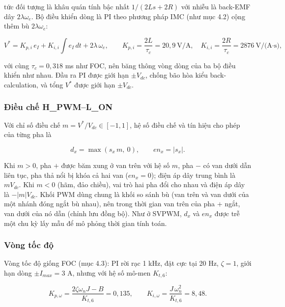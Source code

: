 tức đối tượng là khâu quán tính bậc nhất $1/(2Ls + 2R)$ với nhiễu là back-EMF dây $2\lambda\omega_e$. Bộ điều khiển dòng là PI theo phương pháp IMC (như mục 4.2) cộng thêm bù $2\lambda\omega_e$:

\begin{equation}
V^* = K_{p,i}\,e_I + K_{i,i}\!\int e_I\,dt + 2\lambda\,\omega_e, \qquad K_{p,i} = \frac{2L}{\tau_c} = 20{,}9\ \text{V/A},\quad K_{i,i} = \frac{2R}{\tau_c} = 2876\ \text{V/(A·s)},
\tag{8.6}\label{eq:8.6}
\end{equation}

với cùng $\tau_c = 0{,}318$ ms như FOC, nên băng thông vòng dòng của ba bộ điều khiển như nhau. Đầu ra PI được giới hạn $\pm$$V_{dc}$, chống bão hòa kiểu back-calculation, và tổng $V^*$ được giới hạn $\pm$$V_{dc}$.

\subsubsection{\texorpdfstring{Điều chế H\_PWM–L\_ON}{Điều chế H\_PWM–L\_ON}}\label{sec:8.2.3}

Với chỉ số điều chế $m = V^*/V_{dc} \in [-1, 1]$, hệ số điều chế và tín hiệu cho phép của từng pha là

\begin{equation}
d_x = \max(s_x\, m,\ 0), \qquad en_x = |s_x|.
\tag{8.7}\label{eq:8.7}
\end{equation}

Khi $m > 0$, pha $+$ được băm xung ở van trên với hệ số $m$, pha $-$ có van dưới dẫn liên tục, pha thả nổi bị khóa cả hai van ($en_x = 0$); điện áp dây trung bình là $m V_{dc}$. Khi $m < 0$ (hãm, đảo chiều), vai trò hai pha đổi cho nhau và điện áp dây là $-|m| V_{dc}$. Khối PWM dùng chung là khối so sánh bù (van trên và van dưới của một nhánh đóng ngắt bù nhau), nên trong thời gian van trên của pha $+$ ngắt, van dưới của nó dẫn (chỉnh lưu đồng bộ). Như ở SVPWM, $d_x$ và $en_x$ được trễ một chu kỳ lấy mẫu để mô phỏng thời gian tính toán.

\subsubsection{Vòng tốc độ}\label{sec:8.2.4}

Vòng tốc độ giống FOC (mục 4.3): PI rời rạc 1 kHz, đặt cực tại 20 Hz, $\zeta = 1$, giới hạn dòng $\pm$$I_{max} = 3$ A, nhưng với hệ số mô-men $K_{t,6}$:

\begin{equation}
K_{p,\omega} = \frac{2\zeta\omega_n J - B}{K_{t,6}} = 0{,}135, \qquad K_{i,\omega} = \frac{J\,\omega_n^2}{K_{t,6}} = 8{,}48.
\tag{8.8}\label{eq:8.8}
\end{equation}

